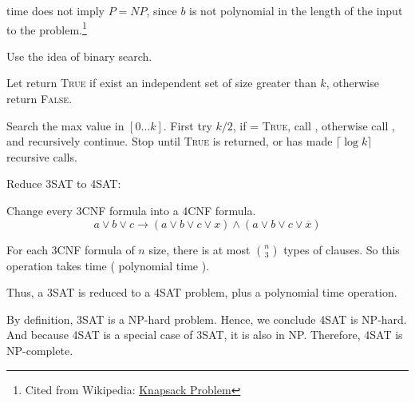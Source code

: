\documentclass[11pt,letterpaper,titlepage,en-US]{article}
\begin{document}
\begin{homeworkProblem}
\begin{homeworkSubProblem}
     time does not imply $P=NP$, since $b$ is not polynomial in the length of the input
    to the problem.\footnote{Cited from Wikipedia:
    \href{https://en.wikipedia.org/wiki/Knapsack_problem}{Knapsack Problem}}
\end{homeworkSubProblem}

\begin{homeworkSubProblem}
Use the idea of binary search.

Let  return \textsc{True} if exist
an independent set of size greater than $k$, otherwise return \textsc{False}.

Search the max value in $[0 \ldots k]$.
First try $k/2$, if  = \textsc{True},
call ,
otherwise 
call ,
and recursively continue.
Stop until \textsc{True} is returned,
or has made $\lceil\log k\rceil$ recursive calls.

\end{homeworkSubProblem}

\begin{homeworkSubProblem}
Reduce 3SAT to 4SAT:

Change every 3CNF formula into a 4CNF formula.
\[a \lor b \lor c \longrightarrow (a \lor b \lor c \lor x) \land (a \lor b \lor c \lor \overline{x})\]

For each 3CNF formula of $n$ size, there is at most $\binom{n}{3}$ types of clauses.
So this operation takes  time ( polynomial time ).

Thus, a 3SAT is reduced to a 4SAT problem, plus a polynomial time operation.

By definition, 3SAT is a NP-hard problem. Hence, we conclude 4SAT is NP-hard.
And because 4SAT is a special case of 3SAT, it is also in NP.
Therefore, 4SAT is NP-complete.
\end{homeworkSubProblem}

\begin{homeworkSubProblem}

\end{homeworkSubProblem}

\end{homeworkProblem}
\end{document}
